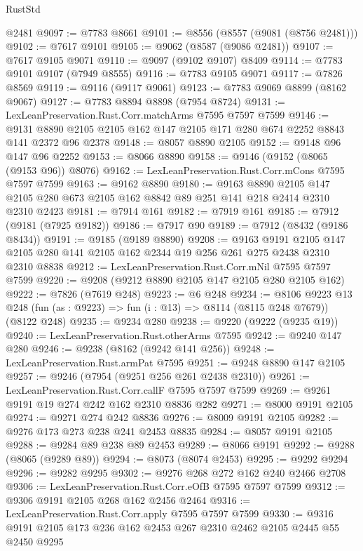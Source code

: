 \begin{lexlean}{RustStd}
\begin{coremodule}
    @2481
@9097 := @7783 @8661
@9101 := @8556 (@8557 (@9081 (@8756 @2481)))
@9102 := @7617 @9101
@9105 := @9062 (@8587 (@9086 @2481))
@9107 := @7617 @9105 @9071
@9110 := @9097 (@9102 @9107) @8409
@9114 := @7783 @9101 @9107 (@7949 @8555)
@9116 := @7783 @9105 @9071
@9117 := @7826 @8569
@9119 := @9116 (@9117 @9061)
@9123 := @7783 @9069 @8899 (@8162 @9067)
@9127 := @7783 @8894 @8898 (@7954 @8724)
@9131 := LexLeanPreservation.Rust.Corr.matchArms @7595 @7597 @7599
@9146 := @9131 @8890 @2105 @2105 @162 @147 @2105 @171 @280 @674 @2252 @8843 @141 @2372 @96 @2378
@9148 := @8057 @8890 @2105
@9152 := @9148 @96 @147 @96 @2252
@9153 := @8066 @8890
@9158 := @9146 (@9152 (@8065 (@9153 @96)) @8076)
@9162 := LexLeanPreservation.Rust.Corr.mCons @7595 @7597 @7599
@9163 := @9162 @8890
@9180 := @9163
    @8890
    @2105
    @147
    @2105
    @280
    @673
    @2105
    @162
    @8842
    @89
    @251
    @141
    @218
    @2414
    @2310
    @2310
    @2423
@9181 := @7914 @161
@9182 := @7919 @161
@9185 := @7912 (@9181 (@7925 @9182))
@9186 := @7917 @90
@9189 := @7912 (@8432 (@9186 @8434))
@9191 := @9185 (@9189 @8890)
@9208 := @9163
    @9191
    @2105
    @147
    @2105
    @280
    @141
    @2105
    @162
    @2344
    @19
    @256
    @261
    @275
    @2438
    @2310
    @2310
    @8838
@9212 := LexLeanPreservation.Rust.Corr.mNil @7595 @7597 @7599
@9220 := @9208 (@9212 @8890 @2105 @147 @2105 @280 @2105 @162)
@9222 := @7826 (@7619 @248)
@9223 := @6 @248
@9234 := @8106
    @9223
    @13
    @248
    (fun (as : @9223) => fun (i : @13) => @8114 (@8115 @248 @7679))
    (@8122 @248)
@9235 := @9234 @280
@9238 := @9220 (@9222 (@9235 @19))
@9240 := LexLeanPreservation.Rust.otherArms @7595
@9242 := @9240 @147 @280
@9246 := @9238 (@8162 (@9242 @141 @256))
@9248 := LexLeanPreservation.Rust.armPat @7595
@9251 := @9248 @8890 @147 @2105
@9257 := @9246 (@7954 (@9251 @256 @261 @2438 @2310))
@9261 := LexLeanPreservation.Rust.Corr.callF @7595 @7597 @7599
@9269 := @9261 @9191 @19 @274 @242 @162 @2310 @8836 @282
@9271 := @8000 @9191 @2105
@9274 := @9271 @274 @242 @8836
@9276 := @8009 @9191 @2105
@9282 := @9276 @173 @273 @238 @241 @2453 @8835
@9284 := @8057 @9191 @2105
@9288 := @9284 @89 @238 @89 @2453
@9289 := @8066 @9191
@9292 := @9288 (@8065 (@9289 @89))
@9294 := @8073 (@8074 @2453)
@9295 := @9292 @9294
@9296 := @9282 @9295
@9302 := @9276 @268 @272 @162 @240 @2466 @2708
@9306 := LexLeanPreservation.Rust.Corr.eOfB @7595 @7597 @7599
@9312 := @9306 @9191 @2105 @268 @162 @2456 @2464
@9316 := LexLeanPreservation.Rust.Corr.apply @7595 @7597 @7599
@9330 := @9316 @9191 @2105 @173 @236 @162 @2453 @267 @2310 @2462 @2105 @2445 @55 @2450 @9295

\end{coremodule}
\end{lexlean}
